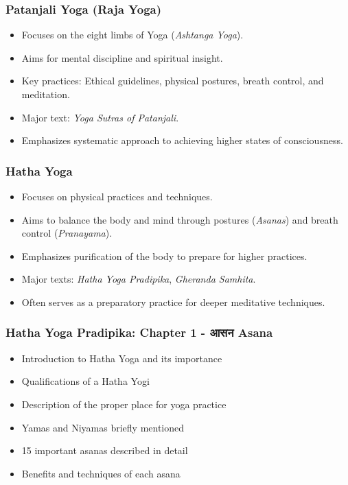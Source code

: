 \begin{frame}[fragile]\frametitle{Patanjali Yoga (Raja Yoga)}

      \begin{itemize}
		\item Focuses on the eight limbs of Yoga (\textit{Ashtanga Yoga}).
		\item Aims for mental discipline and spiritual insight.
		\item Key practices: Ethical guidelines, physical postures, breath control, and meditation.
		\item Major text: \textit{Yoga Sutras of Patanjali}.
		\item Emphasizes systematic approach to achieving higher states of consciousness.
	  \end{itemize}

\end{frame}



\begin{frame}[fragile]\frametitle{Hatha Yoga}

      \begin{itemize}
		\item Focuses on physical practices and techniques.
		\item Aims to balance the body and mind through postures (\textit{Asanas}) and breath control (\textit{Pranayama}).
		\item Emphasizes purification of the body to prepare for higher practices.
		\item Major texts: \textit{Hatha Yoga Pradipika}, \textit{Gheranda Samhita}.
		\item Often serves as a preparatory practice for deeper meditative techniques.
	  \end{itemize}

\end{frame}


\begin{frame}[fragile]\frametitle{Hatha Yoga Pradipika: Chapter 1 - आसन  Asana}
\begin{itemize}
    \item Introduction to Hatha Yoga and its importance
    \item Qualifications of a Hatha Yogi
    \item Description of the proper place for yoga practice
    \item Yamas and Niyamas briefly mentioned
    \item 15 important asanas described in detail
    \item Benefits and techniques of each asana
\end{itemize}
\end{frame}

